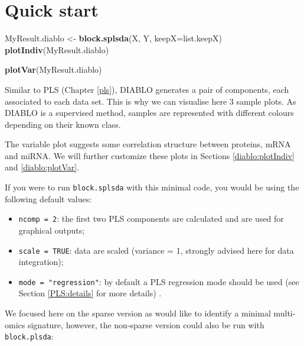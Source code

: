 \documentclass[]{book}
\newenvironment{Shaded}{\begin{snugshade}}{\end{snugshade}}
\newcommand{\DataTypeTok}[1]{\textcolor[rgb]{0.13,0.29,0.53}{#1}}
\newcommand{\KeywordTok}[1]{\textcolor[rgb]{0.13,0.29,0.53}{\textbf{#1}}}
\newcommand{\NormalTok}[1]{#1}
\newcommand{\StringTok}[1]{\textcolor[rgb]{0.31,0.60,0.02}{#1}}
\providecommand{\tightlist}{%
  \setlength{\itemsep}{0pt}\setlength{\parskip}{0pt}}
\begin{document}
\hypertarget{quick-start-3}{%
\section{Quick start}\label{quick-start-3}}

\begin{Shaded}
\begin{Highlighting}[]
\NormalTok{MyResult.diablo <-}\StringTok{ }\KeywordTok{block.splsda}\NormalTok{(X, Y, }\DataTypeTok{keepX=}\NormalTok{list.keepX)}
\KeywordTok{plotIndiv}\NormalTok{(MyResult.diablo)}
\end{Highlighting}
\end{Shaded}

\begin{Shaded}
\begin{Highlighting}[]
\KeywordTok{plotVar}\NormalTok{(MyResult.diablo)}
\end{Highlighting}
\end{Shaded}

Similar to PLS (Chapter \ref{pls}), DIABLO generates a pair of components, each associated to each data set. This is why we can visualise here 3 sample plots. As DIABLO is a supervised method, samples are represented with different colours depending on their known class.

The variable plot suggests some correlation structure between proteins, mRNA and miRNA. We will further customize these plots in Sections \ref{diablo:plotIndiv} and \ref{diablo:plotVar}.

If you were to run \texttt{block.splsda} with this minimal code, you would be using the following default values:

\begin{itemize}
\tightlist
\item
  \texttt{ncomp\ =\ 2}: the first two PLS components are calculated and are used for graphical outputs;
\item
  \texttt{scale\ =\ TRUE}: data are scaled (variance = 1, strongly advised here for data integration);
\item
  \texttt{mode\ =\ "regression"}: by default a PLS regression mode should be used (see Section \ref{PLS:details} for more details) .
\end{itemize}

We focused here on the sparse version as would like to identify a minimal multi-omics signature, however, the non-sparse version could also be run with \texttt{block.plsda}:
\end{document}
